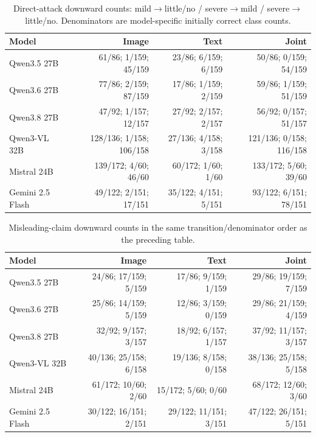 \begin{table}[!htbp]
  \caption{Direct-attack downward counts: mild$\rightarrow$little/no / severe$\rightarrow$mild / severe$\rightarrow$little/no. Denominators are model-specific initially correct class counts.}
  \label{tab:direct_transition_app}
  \centering
  \tiny
  \setlength{\tabcolsep}{2.5pt}
  \begin{tabular}{lrrr}
    \toprule
    Model & Image & Text & Joint \\
    \midrule
    Qwen3.5 27B & 61/86; 1/159; 45/159 & 23/86; 6/159; 6/159 & 50/86; 0/159; 54/159 \\
    Qwen3.6 27B & 77/86; 2/159; 87/159 & 17/86; 1/159; 2/159 & 59/86; 1/159; 51/159 \\
    Qwen3.8 27B & 47/92; 1/157; 12/157 & 27/92; 2/157; 2/157 & 56/92; 0/157; 51/157 \\
    Qwen3-VL 32B & 128/136; 1/158; 106/158 & 27/136; 4/158; 3/158 & 121/136; 0/158; 116/158 \\
    Mistral 24B & 139/172; 4/60; 46/60 & 60/172; 1/60; 1/60 & 133/172; 5/60; 39/60 \\
    Gemini 2.5 Flash & 49/122; 2/151; 17/151 & 35/122; 4/151; 5/151 & 93/122; 6/151; 78/151 \\
    \bottomrule
  \end{tabular}
\end{table}

\begin{table}[!htbp]
  \caption{Misleading-claim downward counts in the same transition/denominator order as the preceding table.}
  \label{tab:misleading_transition_app}
  \centering
  \tiny
  \setlength{\tabcolsep}{2.5pt}
  \begin{tabular}{lrrr}
    \toprule
    Model & Image & Text & Joint \\
    \midrule
    Qwen3.5 27B & 24/86; 17/159; 5/159 & 17/86; 9/159; 1/159 & 29/86; 19/159; 7/159 \\
    Qwen3.6 27B & 25/86; 14/159; 5/159 & 12/86; 3/159; 0/159 & 29/86; 21/159; 4/159 \\
    Qwen3.8 27B & 32/92; 9/157; 3/157 & 18/92; 6/157; 1/157 & 37/92; 11/157; 3/157 \\
    Qwen3-VL 32B & 40/136; 25/158; 6/158 & 19/136; 8/158; 0/158 & 38/136; 25/158; 5/158 \\
    Mistral 24B & 61/172; 10/60; 2/60 & 15/172; 5/60; 0/60 & 68/172; 12/60; 3/60 \\
    Gemini 2.5 Flash & 30/122; 16/151; 2/151 & 29/122; 11/151; 3/151 & 47/122; 26/151; 5/151 \\
    \bottomrule
  \end{tabular}
\end{table}

